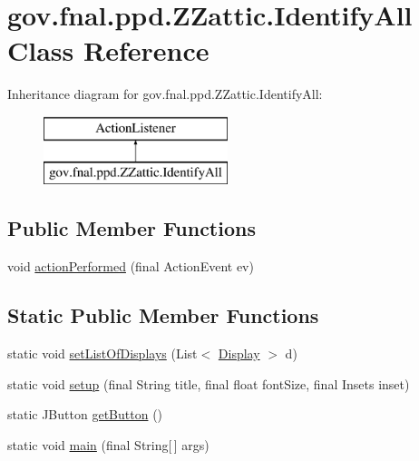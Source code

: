 \hypertarget{classgov_1_1fnal_1_1ppd_1_1ZZattic_1_1IdentifyAll}{\section{gov.\-fnal.\-ppd.\-Z\-Zattic.\-Identify\-All Class Reference}
\label{classgov_1_1fnal_1_1ppd_1_1ZZattic_1_1IdentifyAll}
}
Inheritance diagram for gov.\-fnal.\-ppd.\-Z\-Zattic.\-Identify\-All\-:\begin{figure}[H]
\begin{center}
\leavevmode
\includegraphics[height=2.000000cm]{classgov_1_1fnal_1_1ppd_1_1ZZattic_1_1IdentifyAll}
\end{center}
\end{figure}
\subsection*{Public Member Functions}
\begin{DoxyCompactItemize}
\item 
void \hyperlink{classgov_1_1fnal_1_1ppd_1_1ZZattic_1_1IdentifyAll_aad393999a0545d86f0cb86ad2c8e3393}{action\-Performed} (final Action\-Event ev)
\end{DoxyCompactItemize}
\subsection*{Static Public Member Functions}
\begin{DoxyCompactItemize}
\item 
static void \hyperlink{classgov_1_1fnal_1_1ppd_1_1ZZattic_1_1IdentifyAll_a6d7b2f33f2aa136b59a347d6571aab5b}{set\-List\-Of\-Displays} (List$<$ \hyperlink{interfacegov_1_1fnal_1_1ppd_1_1dd_1_1signage_1_1Display}{Display} $>$ d)
\item 
static void \hyperlink{classgov_1_1fnal_1_1ppd_1_1ZZattic_1_1IdentifyAll_a7ed8528dfcc7fde5c6b744a5fd68d6a8}{setup} (final String title, final float font\-Size, final Insets inset)
\item 
static J\-Button \hyperlink{classgov_1_1fnal_1_1ppd_1_1ZZattic_1_1IdentifyAll_aeae2a458075736509e702ee208ae5092}{get\-Button} ()
\item 
static void \hyperlink{classgov_1_1fnal_1_1ppd_1_1ZZattic_1_1IdentifyAll_a3cfdf38b80637265de10f48b4e4097b1}{main} (final String\mbox{[}$\,$\mbox{]} args)
\end{DoxyCompactItemize}



